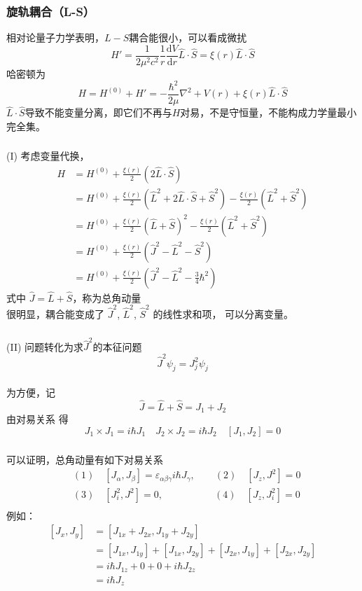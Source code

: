 \begin{frame}
  \frametitle{旋轨耦合（L-S）}
  \解 相对论量子力学表明，$L-S$耦合能很小，可以看成微扰
  \[ H' = \frac{1}{2\mu ^2 c^2} \frac{1}{r} \frac{\mathrm{d}V}{\mathrm{d} r} \hat{L}\cdot \hat{S} = \xi(r)\hat{L}\cdot \hat{S} \]
  哈密顿为
  \[ H = H^{(0)} + H' = - \frac{\hbar^2}{2\mu} \nabla^2 +V(r) + \xi(r)\hat{L}\cdot \hat{S} \]
$\hat{L}\cdot \hat{S}$导致不能变量分离，即它们不再与$H$对易，不是守恒量，不能构成力学量最小完全集。 
\end{frame} 

\begin{frame}[label=current]
  \frametitle{}
(I) 考虑变量代换，
\[ \begin{aligned}
  H &= H^{(0)} + \frac{\xi(r)}{2}(2\hat{L}\cdot \hat{S}) \\ 
  &= H^{(0)} + \frac{\xi(r)}{2}( \hat{L}^2 + 2\hat{L}\cdot \hat{S} + \hat{S}^2) - \frac{\xi(r)}{2}(\hat{L}^2 + \hat{S}^2) \\
  &=  H^{(0)} + \frac{\xi(r)}{2} ( \hat{L} + \hat{S})^2 - \frac{\xi(r)}{2}(\hat{L}^2 + \hat{S}^2) \\
  &= H^{(0)} + \frac{\xi(r)}{2} (\hat{J}^2 - \hat{L}^2 - \hat{S}^2) \\
  &= H^{(0)} + \frac{\xi(r)}{2} (\hat{J}^2 - \hat{L}^2 - \frac{3}{4}\hbar^2)
\end{aligned} \]
式中 $\hat{J} = \hat{L} + \hat{S} $，称为总角动量\\

很明显，耦合能变成了 $\hat{J}^2$, $\hat{L}^2$, $\hat{S}^2$ 的线性求和项， 可以分离变量。
\end{frame} 

\begin{frame}[label=current]
  \frametitle{}
(II)  问题转化为求$\hat{J}^2$的本征问题
  \[ \boxed{\hat{J}^2 \psi _j = J^2_j \psi _j}\]
  ~~\\ 
  为方便，记
  $$\hat{J} = \hat{L} + \hat{S} = J_1 + J_2$$ 
  由对易关系
  得
  \[ J_1 \times J_1 = i\hbar J_1 \quad J_2 \times J_2 = i\hbar J_2 \quad [J_1, J_2] =0 \]
\end{frame} 

\begin{frame}[label=current]
  \frametitle{}
可以证明，总角动量有如下对易关系
\[
  \begin{aligned}
   &(1) \quad [J_\alpha,J_\beta ] = \varepsilon_{\alpha\beta\gamma}  i \hbar J_\gamma , \qquad (2)\quad [J_z,J^2 ] =0  \\ 
   &(3) \quad [J^2 _i,J^2 ] = 0 , \qquad~\quad \qquad (4)\quad [J_z, J_i^2 ] =0  \\ 
  \end{aligned} 
  \]
例如：
\[
  \begin{aligned}
  [J_x,J_y ] &= [J_{1x} + J_{2x},J_{1y} + J_{2y}] \\
  &= [J_{1x}, J_{1y} ]+ [J_{1x} ,J_{2y}] + [J_{2x},J_{1y}] + [J_{2x},J_{2y}] \\
  &= i \hbar J_{1z} + 0 + 0 + i \hbar J_{2z} \\
  &= i \hbar J_{z}
  \end{aligned} 
  \]
\end{frame}

